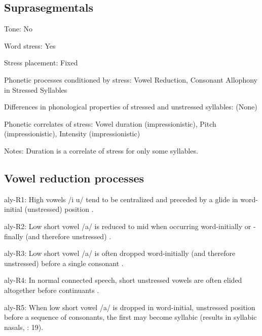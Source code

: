 {\subsection*{Suprasegmentals}
\begin{appendixdesc}
\item[Tone:] No

\item[Word stress:] Yes

\item[Stress placement:] Fixed

\item[Phonetic processes conditioned by stress:] Vowel Reduction, Consonant Allophony in Stressed Syllables

\item[Differences in phonological properties of stressed and unstressed syllables:] (None)

\item[Phonetic correlates of stress:] Vowel duration (impressionistic), Pitch (impressionistic), Intensity (impressionistic)

\item[Notes:] Duration is a correlate of stress for only some syllables.
\end{appendixdesc}
\subsection*{Vowel reduction processes}
\begin{appendixdesc}

\item[aly-R1:] High vowels /i u/ tend to be centralized and preceded by a glide in word-initial (unstressed) position \citep[25]{Yallop1977}.

\item[aly-R2:] Low short vowel /a/ is reduced to mid when occurring word-initially or -finally (and therefore unstressed) \citep[25]{Yallop1977}.

\item[aly-R3:] Low short vowel /a/ is often dropped word-initially (and therefore unstressed) before a single consonant \citep[28]{Yallop1977}.

\item[aly-R4:] In normal connected speech, short unstressed vowels are often elided altogether before continuants \citep[27]{Yallop1977}.

\item[aly-R5:] When low short vowel /a/ is dropped in word-initial, unstressed position before a sequence of consonants, the first may become syllabic (results in syllabic nasals, \citealt{Yallop1977}: 19).
\end{appendixdesc}
}
